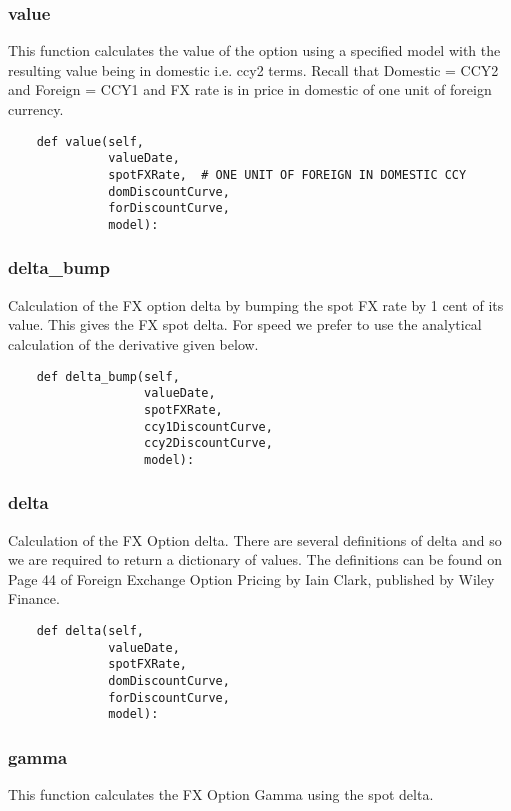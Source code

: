 \documentclass[twoside,11pt]{book}
\begin{document}
\subsubsection*{{\bf value}}
This function calculates the value of the option using a specified model with the resulting value being in domestic i.e. ccy2 terms. Recall that Domestic = CCY2 and Foreign = CCY1 and FX rate is in price in domestic of one unit of foreign currency.  

\begin{lstlisting}
    def value(self,
              valueDate,
              spotFXRate,  # ONE UNIT OF FOREIGN IN DOMESTIC CCY
              domDiscountCurve,
              forDiscountCurve,
              model):
\end{lstlisting}

\subsubsection*{{\bf delta\_bump}}
Calculation of the FX option delta by bumping the spot FX rate by 1 cent of its value. This gives the FX spot delta. For speed we prefer to use the analytical calculation of the derivative given below.  

\begin{lstlisting}
    def delta_bump(self,
                   valueDate,
                   spotFXRate,
                   ccy1DiscountCurve,
                   ccy2DiscountCurve,
                   model):
\end{lstlisting}

\subsubsection*{{\bf delta}}
Calculation of the FX Option delta. There are several definitions of delta and so we are required to return a dictionary of values. The definitions can be found on Page 44 of Foreign Exchange Option Pricing by Iain Clark, published by Wiley Finance.  

\begin{lstlisting}
    def delta(self,
              valueDate,
              spotFXRate,
              domDiscountCurve,
              forDiscountCurve,
              model):
\end{lstlisting}

\subsubsection*{{\bf gamma}}
This function calculates the FX Option Gamma using the spot delta.  
\end{document}
